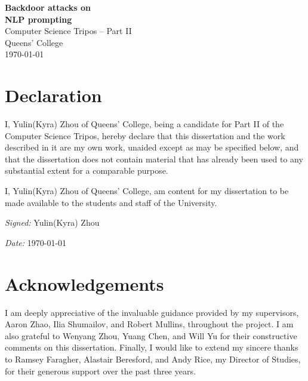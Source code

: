 \documentclass[12pt,a4paper,twoside,openright]{report}
\begin{document}

\pagestyle{empty}


\vspace*{60mm}
\begin{center}
	\Huge
	\textbf{Backdoor attacks on \\ NLP prompting} \\[10mm]
	\huge
	Computer Science Tripos -- Part II \\[4mm]
	Queens' College \\[4mm]
	\today \\[95mm]
\end{center}

\thispagestyle{empty}


\pagestyle{plain}

\setcounter{page}{1}

\section*{Declaration}

 {
  \setlength{\parskip}{\bigskipamount}

  I, Yulin(Kyra) Zhou of Queens' College, being a candidate for Part II of the Computer Science Tripos, hereby declare that this dissertation and the work described in it are my own work, unaided except as may be specified below, and that the dissertation does not contain material that has already been used to any substantial extent for a comparable purpose.

  I, Yulin(Kyra) Zhou of Queens' College, am content for my dissertation to be
  made available to the students and staff of the University.

  \emph{Signed:} Yulin(Kyra) Zhou

  \setlength{\parskip}{\smallskipamount}

  \emph{Date:} \today
 }

\section*{Acknowledgements}

I am deeply appreciative of the invaluable guidance provided by my supervisors, Aaron Zhao, Ilia Shumailov, and Robert Mullins, throughout the project. I am also grateful to Wenyang Zhou, Yuang Chen, and Will Yu for their constructive comments on this dissertation. Finally, I would like to extend my sincere thanks to Ramsey Faragher, Alastair Beresford, and Andy Rice, my Director of Studies, for their generous support over the past three years.
\end{document}

